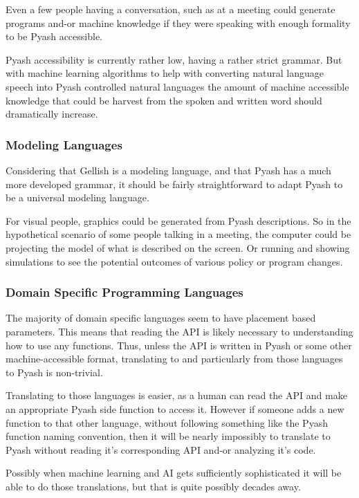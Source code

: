 Even a few people having a conversation, such as at a meeting could generate
programs and-or machine knowledge if they were speaking with enough formality to
be Pyash accessible.

Pyash accessibility is currently rather low, having a rather strict grammar. But
with machine learning algorithms to help with converting natural language speech
into Pyash controlled natural languages the amount of machine accessible 
knowledge that could be harvest from the spoken and written word should
dramatically increase.

\subsubsection{Modeling Languages}
Considering that Gellish is a modeling language, and that Pyash has a much more
developed grammar, it should be fairly straightforward to adapt Pyash to be a
universal modeling language. 

For visual people, graphics could be generated from Pyash descriptions. So in
the hypothetical scenario of some people talking in a meeting,  the computer
could be projecting the model of what is described on the screen. Or running and
showing simulations to see the potential outcomes of various policy or program 
changes. 

\subsubsection{Domain Specific Programming Languages}
The majority of domain specific languages seem to have placement based
parameters. This means that reading the API is likely necessary to understanding
how to use any functions.  Thus, unless the API is written in Pyash or some other
machine-accessible format, translating to and particularly from those languages
to Pyash is non-trivial. 

Translating to those languages is easier, as a human can read the API and make
an appropriate Pyash side function to access it.  However if someone adds a new
function to that other language, without following something like the Pyash
function naming convention, then it will be nearly impossibly to translate to
Pyash without reading it's corresponding API and-or analyzing it's code. 

Possibly when machine learning and AI gets sufficiently sophisticated it will be
able to do those translations, but that is quite possibly decades away. 

